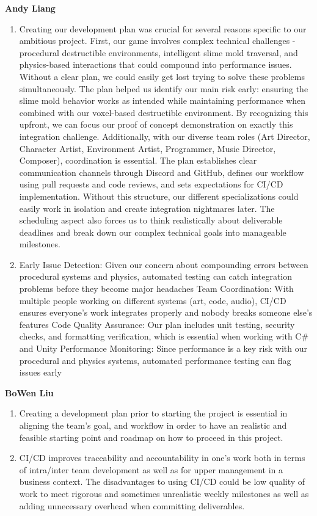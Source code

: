 \documentclass{article}
\begin{document}
\textbf{Andy Liang}
\begin{enumerate}
\item{Creating our development plan was crucial for several reasons specific to our ambitious project. First, our game involves complex technical challenges - procedural destructible environments, intelligent slime mold traversal, and physics-based interactions that could compound into performance issues. Without a clear plan, we could easily get lost trying to solve these problems simultaneously. The plan helped us identify our main risk early: ensuring the slime mold behavior works as intended while maintaining performance when combined with our voxel-based destructible environment. By recognizing this upfront, we can focus our proof of concept demonstration on exactly this integration challenge. Additionally, with our diverse team roles (Art Director, Character Artist, Environment Artist, Programmer, Music Director, Composer), coordination is essential. The plan establishes clear communication channels through Discord and GitHub, defines our workflow using pull requests and code reviews, and sets expectations for CI/CD implementation. Without this structure, our different specializations could easily work in isolation and create integration nightmares later. The scheduling aspect also forces us to think realistically about deliverable deadlines and break down our complex technical goals into manageable milestones. }
\item{Early Issue Detection: Given our concern about compounding errors between procedural systems and physics, automated testing can catch integration problems before they become major headaches
Team Coordination: With multiple people working on different systems (art, code, audio), CI/CD ensures everyone's work integrates properly and nobody breaks someone else's features
Code Quality Assurance: Our plan includes unit testing, security checks, and formatting verification, which is essential when working with C\# and Unity
Performance Monitoring: Since performance is a key risk with our procedural and physics systems, automated performance testing can flag issues early}
\end{enumerate}

\textbf{BoWen Liu}
\begin{enumerate}
\item{Creating a development plan prior to starting the project is essential in aligning the team’s goal, and workflow in order to have an realistic and feasible starting point and roadmap on how to proceed in this project.}
\item{CI/CD improves traceability and accountability in one’s work both in terms of intra/inter team development as well as for upper management in a business context. The disadvantages to using CI/CD could be low quality of work to meet rigorous and sometimes unrealistic weekly milestones as well as adding unnecessary overhead when committing deliverables.}
\end{enumerate}
\end{document}
